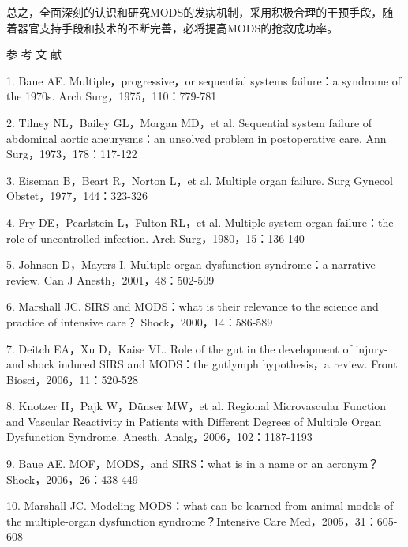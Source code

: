 总之，全面深刻的认识和研究MODS的发病机制，采用积极合理的干预手段，随着器官支持手段和技术的不断完善，必将提高MODS的抢救成功率。

\protect\hypertarget{text00096.html}{}{}

\hypertarget{text00096.htmlux5cux23CHP3-11-5}{}
参 考 文 献

1. Baue AE. Multiple，progressive，or sequential systems failure：a
syndrome of the 1970s. Arch Surg，1975，110：779-781

2. Tilney NL，Bailey GL，Morgan MD，et al. Sequential system failure of
abdominal aortic aneurysms：an unsolved problem in postoperative care.
Ann Surg，1973，178：117-122

3. Eiseman B，Beart R，Norton L，et al. Multiple organ failure. Surg
Gynecol Obstet，1977，144：323-326

4. Fry DE，Pearlstein L，Fulton RL，et al. Multiple system organ
failure：the role of uncontrolled infection. Arch
Surg，1980，15：136-140

5. Johnson D，Mayers I. Multiple organ dysfunction syndrome：a narrative
review. Can J Anesth，2001，48：502-509

6. Marshall JC. SIRS and MODS：what is their relevance to the science
and practice of intensive care？ Shock，2000，14：586-589

7. Deitch EA，Xu D，Kaise VL. Role of the gut in the development of
injury- and shock induced SIRS and MODS：the gutlymph hypothesis，a
review. Front Biosci，2006，11：520-528

8. Knotzer H，Pajk W，Dünser MW，et al. Regional Microvascular Function
and Vascular Reactivity in Patients with Different Degrees of Multiple
Organ Dysfunction Syndrome. Anesth. Analg，2006，102：1187-1193

9. Baue AE. MOF，MODS，and SIRS：what is in a name or an acronym？
Shock，2006，26：438-449

10. Marshall JC. Modeling MODS：what can be learned from animal models
of the multiple-organ dysfunction syndrome？Intensive Care
Med，2005，31：605-608

\protect\hypertarget{text00097.html}{}{}

